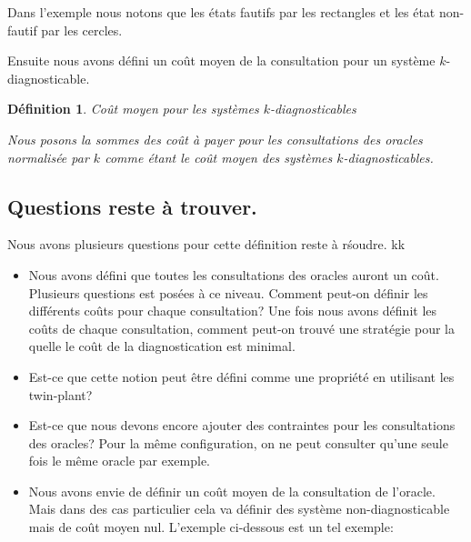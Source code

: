 \documentclass[a4paper,10pt]{article}
\newtheorem{mydef}{D\'efinition}
\begin{document}
Dans l'exemple nous notons que les \'etats fautifs par les rectangles et les \'etat non-fautif par les cercles.

Ensuite nous avons d\'efini un co\^ut moyen de la consultation pour un syst\`eme $k$-diagnosticable.

\begin{mydef}{Co\^ut moyen pour les syst\`emes $k$-diagnosticables}
  
  Nous posons la sommes des co\^ut \`a payer pour les consultations des oracles normalis\'ee par $k$ comme \'etant le co\^ut moyen des syst\`emes $k$-diagnosticables.
\end{mydef}

\subsection{Questions reste \`a trouver.}

Nous avons plusieurs questions pour cette d\'efinition reste \`a r\'soudre.
kk
\begin{itemize}
\item Nous avons d\'efini que toutes les consultations des oracles auront un co\^ut. Plusieurs questions est pos\'ees \`a ce niveau. Comment peut-on d\'efinir les diff\'erents co\^uts pour chaque consultation? Une fois nous avons d\'efinit les co\^uts de chaque consultation, comment peut-on trouv\'e une strat\'egie pour la quelle le co\^ut de la diagnostication est minimal.

\item Est-ce que cette notion peut \^etre d\'efini comme une propri\'et\'e en utilisant les twin-plant?

\item Est-ce que nous devons encore ajouter des contraintes pour les consultations des oracles? Pour la m\^eme configuration, on ne peut consulter qu'une seule fois le m\^eme oracle par exemple.

\item Nous avons envie de d\'efinir un co\^ut moyen de la consultation de l'oracle. Mais dans des cas particulier cela va d\'efinir des syst\`eme non-diagnosticable mais de co\^ut moyen nul. L'exemple ci-dessous est un tel exemple:

\begin{figure}[H]
  \begin{center}
  \end{center}
\end{figure}

  
\end{itemize}
\end{document}
